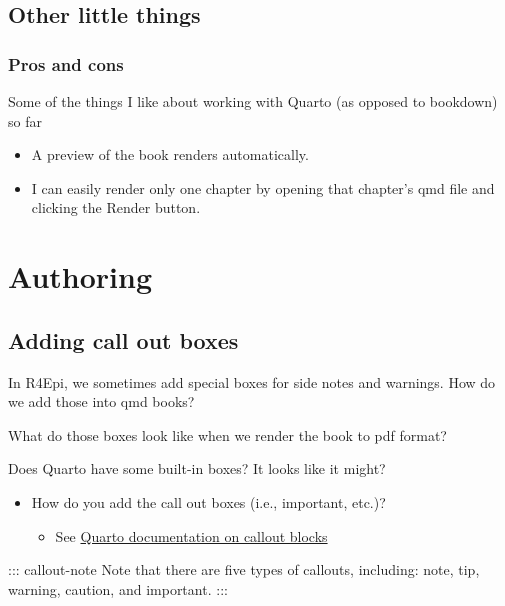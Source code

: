 \documentclass[
  letterpaper,
  DIV=11,
  numbers=noendperiod]{scrreprt}
\newenvironment{Shaded}{\begin{snugshade}}{\end{snugshade}}
\newcommand{\InformationTok}[1]{\textcolor[rgb]{0.37,0.37,0.37}{#1}}
\newcommand{\NormalTok}[1]{\textcolor[rgb]{0.00,0.23,0.31}{#1}}
\providecommand{\tightlist}{%
  \setlength{\itemsep}{0pt}\setlength{\parskip}{0pt}}\usepackage{longtable,booktabs,array}
\begin{document}
\chapter{Other little things}\label{other}

\section{Pros and cons}\label{pros-and-cons}

Some of the things I like about working with Quarto (as opposed to
bookdown) so far

\begin{itemize}
\item
  A preview of the book renders automatically.
\item
  I can easily render only one chapter by opening that chapter's qmd
  file and clicking the Render button.
\end{itemize}

\part{Authoring}

\chapter{Adding call out boxes}\label{adding-call-out-boxes}

In R4Epi, we sometimes add special boxes for side notes and warnings.
How do we add those into qmd books?

What do those boxes look like when we render the book to pdf format?

Does Quarto have some built-in boxes? It looks like it might?

\begin{itemize}
\tightlist
\item
  How do you add the call out boxes (i.e., important, etc.)?

  \begin{itemize}
  \tightlist
  \item
    See \href{https://quarto.org/docs/authoring/callouts.html}{Quarto
    documentation on callout blocks}
  \end{itemize}
\end{itemize}

\begin{Shaded}
\begin{Highlighting}[]
\NormalTok{::: callout{-}note}
\NormalTok{Note that there are five types of callouts, including: }\InformationTok{\textasciigrave{}note\textasciigrave{}}\NormalTok{, }\InformationTok{\textasciigrave{}tip\textasciigrave{}}\NormalTok{, }\InformationTok{\textasciigrave{}warning\textasciigrave{}}\NormalTok{, }\InformationTok{\textasciigrave{}caution\textasciigrave{}}\NormalTok{, and }\InformationTok{\textasciigrave{}important\textasciigrave{}}\NormalTok{.}
\NormalTok{:::}
\end{Highlighting}
\end{Shaded}
\end{document}
